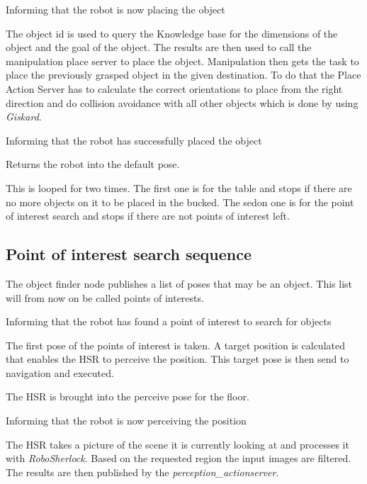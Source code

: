 \documentclass[main.tex]{subfiles}
\begin{document}
	Informing that the robot is now placing the object

	The object id is used to query the Knowledge base for the dimensions of the object and the goal of the object. The results are then used to call the manipulation place server to place the object. Manipulation then gets the task to place the previously grasped object in the given destination. To do that the Place Action Server has to calculate the correct orientations to place from the right direction and do collision avoidance with all other objects which is done by using \textit{Giskard}.
	 
	Informing that the robot has successfully placed the object

	Returns the robot into the default pose.
	
	This is looped for two times.
	The first one is for the table and stops if there are no more objects on it to be placed in the bucked. The sedon one is for the point of interest search and stops if there are not points of interest left.
	
	\subsection{Point of interest search sequence}
	The object finder node publishes a list of poses that may be an object. This list will from now on be called points of interests.
	
    Informing that the robot has found a point of interest to search for objects
    
    The first pose of the points of interest is taken. A target position is calculated that enables the HSR to perceive the position. This target pose is then send to navigation and executed.
    
    The HSR is brought into the perceive pose for the floor.
    
    Informing that the robot is now perceiving the position
      
	The HSR takes a picture of the scene it is currently looking at and processes it with \textit{RoboSherlock}. Based on the requested region the input images are filtered. The results are then published by the \textit{perception\_actionserver}.
\end{document}
